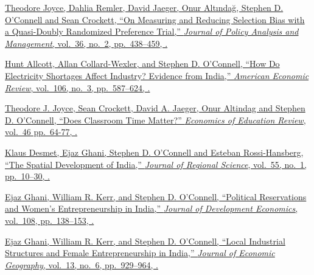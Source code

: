 \documentclass[letterpaper,10pt,oneside]{article}
\begin{document}
\begin{body}
\EntryGapNoBreak
\href{http://www.stephenoconnell.org/files/DPRTjpam_final.pdf}
{Theodore Joyce, Dahlia Remler, David Jaeger, Onur Altındağ, Stephen D. O'Connell and Sean Crockett,
``On Measuring and Reducing Selection Bias with a Quasi-Doubly Randomized Preference Trial,''
\textit{Journal of Policy Analysis and Management},
vol.~36,
no.~2,
pp.~438--459,
.}

\EntryGapNoBreak
\href{http://www.stephenoconnell.org/files/ACWO2016_AER_Shortages.pdf}
{Hunt Allcott, Allan Collard-Wexler, and Stephen D. O'Connell,
``How Do Electricity Shortages Affect Industry? Evidence from India,''
\textit{American Economic Review},
vol.~106,
no.~3,
pp.~587--624,
.}

\EntryGapNoBreak
\href{http://www.djaeger.org/research/pubs/EER_forthcoming.pdf}
{Theodore J. Joyce, Sean Crockett, David A. Jaeger, Onur Altindag and Stephen D. O'Connell,
``Does Classroom Time Matter?''
\textit{Economics of Education Review},
vol.~46
pp.~64-77,
.}




\EntryGapNoBreak
\href{http://elibrary.worldbank.org/doi/abs/10.1596/1813-9450-6060}
{Klaus Desmet, Ejaz Ghani, Stephen D. O'Connell and Esteban Rossi-Hansberg,
``The Spatial Development of India,''
\textit{Journal of Regional Science},
vol.~55,
no.~1,
pp.~10--30,
.}

\EntryGapNoBreak

\href{http://www.stephenoconnell.org/files/GKO_ReservationsEntry.pdf}
{Ejaz Ghani, William R. Kerr, and Stephen D. O'Connell,
``Political Reservations and Women's Entrepreneurship in India,''
\textit{Journal of Development Economics},
vol.~108,
pp.~138--153,
.}


\EntryGapNoBreak

\href{http://www.stephenoconnell.org/files/Ghani_Kerr_OConnell_JEG13.pdf}
{Ejaz Ghani, William R. Kerr, and Stephen D. O'Connell,
``Local Industrial Structures and Female Entrepreneurship in India,''
\textit{Journal of Economic Geography},
vol.~13,
no.~6,
pp.~929--964,
.}


\end{body}
\end{document}
